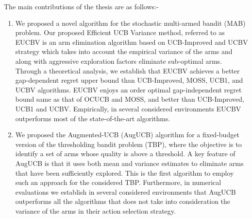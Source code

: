 The main contributions of the thesis are as follows:-
\begin{enumerate}
\item We proposed a novel algorithm for the stochastic multi-armed bandit (MAB) problem. Our proposed Efficient UCB Variance method, referred to as EUCBV is an arm elimination algorithm based on UCB-Improved and UCBV strategy which takes into account the empirical variance of the arms and along with aggressive exploration factors eliminate sub-optimal arms. Through a theoretical analysis, we establish that EUCBV achieves a better gap-dependent regret upper bound than UCB-Improved, MOSS, UCB1, and UCBV algorithms. EUCBV enjoys an order optimal gap-independent regret bound same as that of OCUCB and MOSS, and better than UCB-Improved, UCB1 and UCBV. Empirically, in several considered environments EUCBV outperforms most of the state-of-the-art algorithms. 

\item We proposed the Augmented-UCB (AugUCB) algorithm for a fixed-budget version of the thresholding bandit problem (TBP), where the objective is to identify a set of arms whose quality is above a threshold. A key feature of AugUCB is that it uses both mean and variance estimates to eliminate arms that have been sufficiently explored. This is the first algorithm to employ such an approach for the considered TBP. Furthermore, in numerical evaluations we establish in several considered environments that AugUCB outperforms all the algorithms that does not take into consideration the variance of the arms in their action selection strategy.

\end{enumerate}
 
